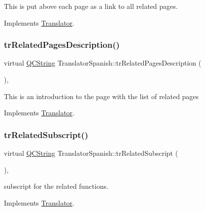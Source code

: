 This is put above each page as a link to all related pages. 

Implements \mbox{\hyperlink{class_translator}{Translator}}.

\mbox{\label{class_translator_spanish_a4c2dbcdc5499e86d4b8731f31ed16023}} 
\subsubsection{\texorpdfstring{trRelatedPagesDescription()}{trRelatedPagesDescription()}}
{\footnotesize\ttfamily virtual \mbox{\hyperlink{class_q_c_string}{Q\+C\+String}} Translator\+Spanish\+::tr\+Related\+Pages\+Description (\begin{DoxyParamCaption}{ }\end{DoxyParamCaption})\hspace{0.3cm}{\ttfamily [inline]}, {\ttfamily [virtual]}}

This is an introduction to the page with the list of related pages 

Implements \mbox{\hyperlink{class_translator}{Translator}}.

\mbox{\label{class_translator_spanish_a764fcb355a0ad62cf34447377d470d32}} 
\subsubsection{\texorpdfstring{trRelatedSubscript()}{trRelatedSubscript()}}
{\footnotesize\ttfamily virtual \mbox{\hyperlink{class_q_c_string}{Q\+C\+String}} Translator\+Spanish\+::tr\+Related\+Subscript (\begin{DoxyParamCaption}{ }\end{DoxyParamCaption})\hspace{0.3cm}{\ttfamily [inline]}, {\ttfamily [virtual]}}

subscript for the related functions. 

Implements \mbox{\hyperlink{class_translator}{Translator}}.

\mbox{\label{class_translator_spanish_a618d6f0abd2fdf29240374189b5978f7}} 
